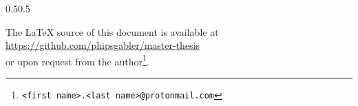 \begin{adjustwidth}{\absleftindent}{\absrightindent}
\begin{symbolicfootnotes}
    \vspace{2ex}
    
    \begin{adjustwidth}{0.5\absleftindent}{0.5\absrightindent}
      \begin{center}

        The \LaTeX{} source of this document is available at\\
        \url{https://github.com/phipsgabler/master-thesis} \\
        or upon request from the author\footnote{\texttt{<first name>.<last name>@protonmail.com}}.
      \end{center}
    \end{adjustwidth}
    
  \end{symbolicfootnotes}
\end{adjustwidth}


